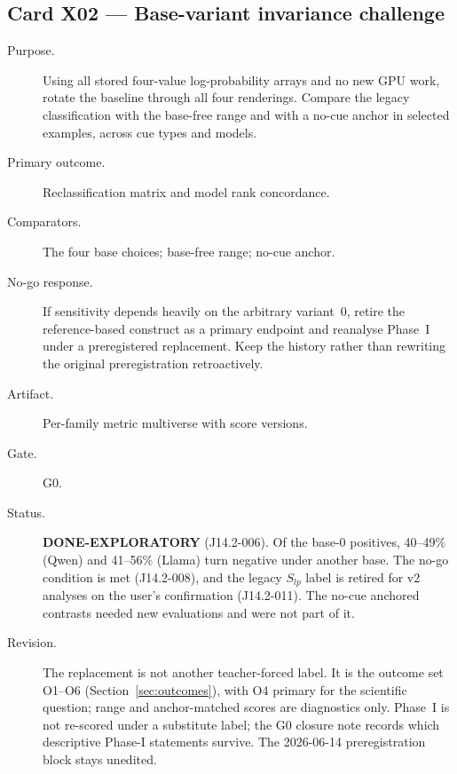 \documentclass[10pt,a4paper]{article}
\begin{document}
\subsection{Card X02 --- Base-variant invariance challenge}
\label{card:X02}
\begin{description}
\item[Purpose.] Using all stored four-value log-probability arrays and no new GPU work, rotate the baseline
through all four renderings. Compare the legacy classification with the base-free range and with a no-cue anchor
in selected examples, across cue types and models.
\item[Primary outcome.] Reclassification matrix and model rank concordance.
\item[Comparators.] The four base choices; base-free range; no-cue anchor.
\item[No-go response.] If sensitivity depends heavily on the arbitrary variant~0, retire the reference-based
construct as a primary endpoint and reanalyse Phase~I under a preregistered replacement. Keep the history rather
than rewriting the original preregistration retroactively.
\item[Artifact.] Per-family metric multiverse with score versions.
\item[Gate.] G0.
\item[Status.] \textbf{DONE-EXPLORATORY} (J14.2-006). Of the base-0 positives, 40--49\% (Qwen) and 41--56\%
(Llama) turn negative under another base. The no-go condition is met (J14.2-008), and the legacy $S_{lp}$ label is
retired for v2 analyses on the user's confirmation (J14.2-011). The no-cue anchored contrasts needed new
evaluations and were not part of it.
\item[Revision.] The replacement is not another teacher-forced label. It is the outcome set O1--O6
(Section~\ref{sec:outcomes}), with O4 primary for the scientific question; range and anchor-matched scores are
diagnostics only. Phase~I is not re-scored under a substitute label; the G0 closure note records which
descriptive Phase-I statements survive. The 2026-06-14 preregistration block stays unedited.
\end{description}

\end{document}
